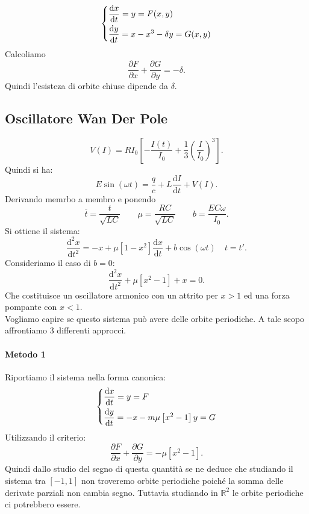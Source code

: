 \begin{exmp}[]
    \[
    \begin{dcases}
	\frac{\text{d} x}{\text{d} t} = y = F(x, y) \\
	\frac{\text{d} y}{\text{d} t} = x-x^3-\delta y = G(x, y) 
    \end{dcases}
    \]
    Calcoliamo 
    \[
        \frac{\partial F}{\partial x} + \frac{\partial G}{\partial y} = -\delta
    .\] 
    Quindi l'esisteza di orbite chiuse dipende da $\delta$.
\end{exmp}
\subsection{Oscillatore Wan Der Pole}%
\label{sub:Oscillatore Wan Der Pole}
\[
    V(I) = RI_0\left[- \frac{I(t) }{I_0} + \frac{1}{3}\left(\frac{I}{I_0}\right)^3\right]
.\] 
Quindi si ha:
\[
    E\sin (\omega t) = \frac{q}{c}+ L\frac{\text{d} I}{\text{d} t}  + V(I) 
.\] 
Derivando memrbo a membro e ponendo
\[
    \overline{t} = \frac{t}{\sqrt{LC}} \qquad  \mu= \frac{RC}{\sqrt{LC} } \qquad  b = \frac{E C \omega}{I_0}
.\] 
Si ottiene il sistema:
\[
    \frac{\text{d} ^2x}{\text{d} t^2} = -x + \mu \left[1-x^2\right]\frac{\text{d} x}{\text{d} t} + b \cos (\omega t) \quad  t = t'
.\] 
Consideriamo il caso di $b = 0$:
\[
    \frac{\text{d} ^2x}{\text{d} t^2} + \mu\left[x^2-1\right]+x = 0
.\] 
Che costituisce un oscillatore armonico con un attrito per $x > 1$ ed una forza pompante con $x<1$.\\
Vogliamo capire se questo sistema può avere delle orbite periodiche. A tale scopo affrontiamo 3 differenti approcci.
\paragraph{Metodo 1}%
Riportiamo il sistema nella forma canonica:
\[
\begin{dcases}
\frac{\text{d} x}{\text{d} t} = y = F\\
\frac{\text{d} y}{\text{d} t} = -x - m\mu\left[x^2-1\right]y = G
\end{dcases}
\]
Utilizzando il criterio:
\[
    \frac{\partial F}{\partial x} + \frac{\partial G}{\partial y} = - \mu\left[x^2-1\right]
.\] 
Quindi dallo studio del segno di questa quantità se ne deduce che studiando il sistema tra $\left[-1, 1\right]$  non troveremo orbite periodiche poiché la somma delle derivate parziali non cambia segno. Tuttavia studiando in $\mathbb{R}^2$  le orbite periodiche ci potrebbero essere.
